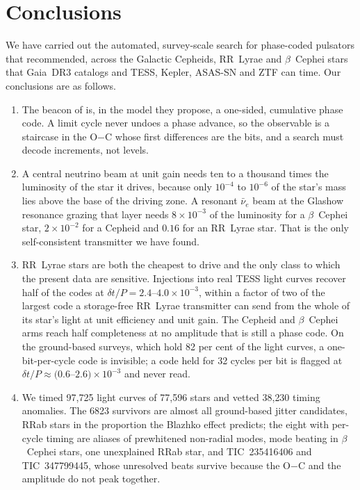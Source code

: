 \documentclass[final,5p]{elsarticle}
\newcommand{\oc}{O$-$C}
\newcommand{\dtp}{\ensuremath{\delta t/P}}
\newcommand{\bcep}{\ensuremath{\beta}~Cephei}
\begin{document}
\section{Conclusions}
\label{sec:conclusions}

We have carried out the automated, survey-scale search for phase-coded pulsators that \citet{Hippke2015} recommended, across the Galactic Cepheids, RR~Lyrae and \bcep{} stars that Gaia~DR3 catalogs and TESS, Kepler, ASAS-SN and ZTF can time. Our conclusions are as follows.

\begin{enumerate}
\item The beacon of \citet{Learned2008} is, in the model they propose, a one-sided, cumulative phase code. A limit cycle never undoes a phase advance, so the observable is a staircase in the \oc{} whose first differences are the bits, and a search must decode increments, not levels.
\item A central neutrino beam at unit gain needs ten to a thousand times the luminosity of the star it drives, because only $10^{-4}$ to $10^{-6}$ of the star's mass lies above the base of the driving zone. A resonant $\bar\nu_e$ beam at the Glashow resonance grazing that layer needs $8\times10^{-3}$ of the luminosity for a \bcep{} star, $2\times10^{-2}$ for a Cepheid and $0.16$ for an RR~Lyrae star. That is the only self-consistent transmitter we have found.
\item RR~Lyrae stars are both the cheapest to drive and the only class to which the present data are sensitive. Injections into real TESS light curves recover half of the codes at $\dtp=2.4$--$4.0\times10^{-3}$, within a factor of two of the largest code a storage-free RR~Lyrae transmitter can send from the whole of its star's light at unit efficiency and unit gain. The Cepheid and \bcep{} arms reach half completeness at no amplitude that is still a phase code. On the ground-based surveys, which hold 82 per cent of the light curves, a one-bit-per-cycle code is invisible; a code held for 32 cycles per bit is flagged at $\dtp\approx(0.6$--$2.6)\times10^{-3}$ and never read.
\item We timed 97{,}725 light curves of 77{,}596 stars and vetted 38{,}230 timing anomalies. The 6823 survivors are almost all ground-based jitter candidates, RRab stars in the proportion the Blazhko effect predicts; the eight with per-cycle timing are aliases of prewhitened non-radial modes, mode beating in \bcep{} stars, one unexplained RRab star, and TIC~235416406 and TIC~347799445, whose unresolved beats survive because the \oc{} and the amplitude do not peak together.

\end{enumerate}
\end{document}
